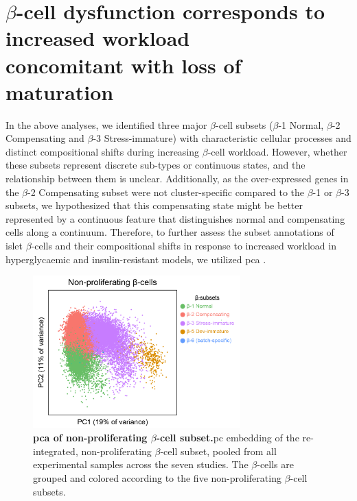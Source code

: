 \clearpage

\section[$\beta$-cell dysfunction corresponds to increased workload concomitant with loss of maturation]{$\beta$-cell dysfunction corresponds to increased workload\\concomitant with loss of maturation}
\label{sec:chp3_betaPCA}

In the above analyses, we identified three major $\beta$-cell subsets ($\beta$-1 Normal, $\beta$-2 Compensating and $\beta$-3 Stress-immature) with characteristic cellular processes and distinct compositional shifts during increasing $\beta$-cell workload. However, whether these subsets represent discrete sub-types or continuous states, and the relationship between them is unclear. Additionally, as the over-expressed genes in the $\beta$-2 Compensating subset were not cluster-specific compared to the $\beta$-1 or $\beta$-3 subsets, we hypothesized that this compensating state might be better represented by a continuous feature that distinguishes normal and compensating cells along a continuum. Therefore, to further assess the subset annotations of islet $\beta$-cells and their compositional shifts in response to increased workload in hyperglycaemic and insulin-resistant models, we utilized \gls{pca} \textbf{\cite{pearson_liii_1901}}.\\


\begin{figure}
\vspace{-20pt}
\includegraphics[width=8cm]{Chapter5/Fig/F3-6-01.png}
\caption[ of non-proliferating $\beta$-cell subsets]{\textbf{\gls{pca} of non-proliferating $\beta$-cell subset.}\gls{pc} embedding of the re-integrated, non-proliferating $\beta$-cell subset, pooled from all experimental samples across the seven studies. The $\beta$-cells are grouped and colored according to the five non-proliferating $\beta$-cell subsets.}
\label{fig:chp3_pca}
\vspace{-10pt}
\end{figure}


